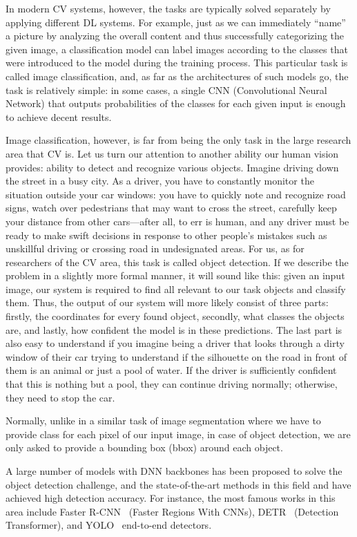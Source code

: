 In modern CV systems, however, the tasks are typically solved separately by applying different DL systems.
For example, just as we can immediately ``name'' a picture by analyzing the overall content and thus successfully categorizing the given image, a classification model can label images according to the classes that were introduced to the model during the training process.
This particular task is called image classification, and, as far as the architectures of such models go, the task is relatively simple: in some cases, a single CNN (Convolutional Neural Network) that outputs probabilities of the classes for each given input is enough to achieve decent results.

Image classification, however, is far from being the only task in the large research area that CV is.
Let us turn our attention to another ability our human vision provides: ability to detect and recognize various objects.
Imagine driving down the street in a busy city.
As a driver, you have to constantly monitor the situation outside your car windows: you have to quickly note and recognize road signs, watch over pedestrians that may want to cross the street, carefully keep your distance from other cars---after all, to err is human, and any driver must be ready to make swift decisions in response to other people's mistakes such as unskillful driving or crossing road in undesignated areas.
For us, as for researchers of the CV area, this task is called object detection.
If we describe the problem in a slightly more formal manner, it will sound like this: given an input image, our system is required to find all relevant to our task objects and classify them.
Thus, the output of our system will more likely consist of three parts: firstly, the coordinates for every found object, secondly, what classes the objects are, and lastly, how confident the model is in these predictions.
The last part is also easy to understand if you imagine being a driver that looks through a dirty window of their car trying to understand if the silhouette on the road in front of them is an animal or just a pool of water.
If the driver is sufficiently confident that this is nothing but a pool, they can continue driving normally; otherwise, they need to stop the car.

Normally, unlike in a similar task of image segmentation where we have to provide class for each pixel of our input image, in case of object detection, we are only asked to provide a bounding box (bbox) around each object.

A large number of models with DNN backbones has been proposed to solve the object detection challenge, and the state-of-the-art methods in this field and have achieved high detection accuracy. 
For instance, the most famous works in this area include Faster R-CNN~\cite{faster_rcnn} (Faster Regions With CNNs), DETR~\cite{detr} (Detection Transformer), and YOLO~\cite{yolov3} end-to-end detectors.

